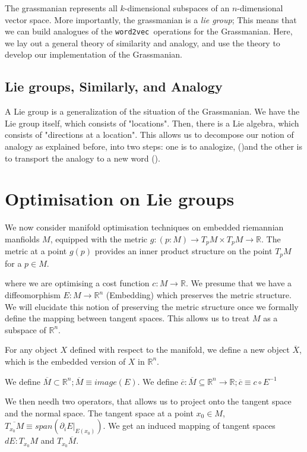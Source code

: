 \documentclass[11pt]{book}
\newcommand{\wtov}{\texttt{word2vec }}
\begin{document}
The grassmanian represents all $k$-dimensional subspaces of an $n$-dimensional
vector space. More importantly, the grassmanian is a \emph{lie group}; This means
that we can build analogues of the \wtov operations for the Grassmanian. Here,
we lay out a general theory of similarity and analogy, and use the theory to
develop our implementation of the Grassmanian.


\section{Lie groups, Similarly, and Analogy}
A Lie group is a generalization of the situation of the Grassmanian. We have the Lie group itself,
which consists of "locations". Then, there is a Lie algebra, which consists of "directions at a location".
This allows us to decompose  our notion of analogy as explained before, into two steps: one is to analogize,
()and the other is to transport the analogy to a new word ().


\chapter{Optimisation on Lie groups}
We now consider manifold optimisation techniques on embedded riemannian manfiolds $M$,
equipped with the metric $g: (p: M) \rightarrow T_p M  \times T_p M \rightarrow \mathbb R$.
The metric at a point $g(p)$ provides an inner product structure on the point $T_pM$
for a $p \in M$.

where we are optimising a cost function $c: M \rightarrow \mathbb R$.
We presume that we have a diffeomorphism $E: M \rightarrow \mathbb R^n$ (Embedding) which
preserves the metric structure. We will elucidate this notion of preserving
the metric structure once we formally define the mapping between tangent spaces.
This allows us to treat $M$ as a subspace of $\mathbb R^n$.

For any object $X$
defined with respect to the manifold, we define a new object $\overline X$, which
is the embedded version of $X$ in $\mathbb R^n$.

We define $\overline M \subset \mathbb R^n; \overline M \equiv image(E)$.
We define $\overline c: \overline M \subseteq \mathbb R^n \rightarrow \mathbb R; \overline c \equiv c \circ E^{-1}$

We then needh two operators, that allows us to project onto the tangent space
and the normal space. The tangent space at a point $x_0 \in M$, $\overline{T_{x_0} M} \equiv span(\partial_i E |_{E(x_0)})$. 
We get an induced mapping of tangent spaces $dE: T_{x_0} M$ and $T_{x_0} \overline M$.
\end{document}
